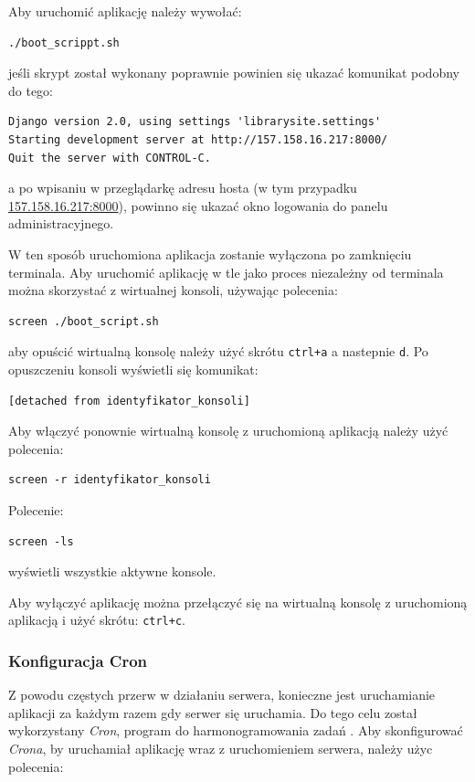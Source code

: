 \documentclass[twoside]{projektInzynierskiMS}
\begin{document}
Aby uruchomić aplikację należy wywołać:

\begin{verbatim}
./boot_scrippt.sh
\end{verbatim}

jeśli skrypt został wykonany poprawnie powinien się ukazać komunikat podobny do tego:

\begin{verbatim}
Django version 2.0, using settings 'librarysite.settings'
Starting development server at http://157.158.16.217:8000/
Quit the server with CONTROL-C.
\end{verbatim}

a po wpisaniu w przeglądarkę adresu hosta (w tym przypadku \href{http://157.158.16.217:8000/}{157.158.16.217:8000}), powinno się ukazać okno logowania do panelu administracyjnego.

W ten sposób uruchomiona aplikacja zostanie wyłączona po zamknięciu terminala. Aby uruchomić aplikację w tle jako proces niezależny od terminala można skorzystać z wirtualnej konsoli, używając polecenia:
\begin{verbatim}
screen ./boot_script.sh
\end{verbatim}
aby opuścić wirtualną konsolę należy użyć skrótu \verb`ctrl+a` a nastepnie \verb`d`. Po opuszczeniu konsoli wyświetli się komunikat:
\begin{verbatim}
[detached from identyfikator_konsoli]
\end{verbatim}

Aby włączyć ponownie wirtualną konsolę z uruchomioną aplikacją należy użyć polecenia:

\begin{verbatim}
screen -r identyfikator_konsoli
\end{verbatim}

Polecenie: 

\begin{verbatim}
screen -ls
\end{verbatim}

wyświetli wszystkie aktywne konsole.

Aby wyłączyć aplikację można przełączyć się na wirtualną konsolę z uruchomioną aplikacją i użyć skrótu: \verb`ctrl+c`.
\subsubsection{Konfiguracja Cron}

Z powodu częstych przerw w działaniu serwera, konieczne jest uruchamianie aplikacji za każdym razem gdy serwer się uruchamia. Do tego celu został wykorzystany \textit{Cron}, program do harmonogramowania zadań \cite{linuxAdmin}. Aby skonfigurować \textit{Crona}, by uruchamiał aplikację wraz z uruchomieniem serwera, należy użyc polecenia:
\end{document}
